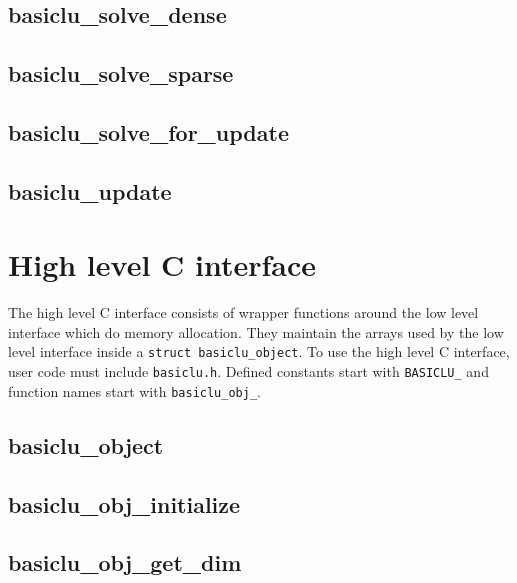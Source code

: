 \documentclass{article}
\newcommand{\ct}{\texttt}
\begin{document}
\newpage
\subsection{basiclu\_solve\_dense}
{\footnotesize

}

\newpage
\subsection{basiclu\_solve\_sparse}
{\footnotesize

}

\newpage
\subsection{basiclu\_solve\_for\_update}
{\footnotesize

}

\newpage
\subsection{basiclu\_update}
{\footnotesize

}
\newpage

\section{High level C interface}
The high level C interface consists of wrapper functions around the low level
interface which do memory allocation. They maintain the arrays used by the low
level interface inside a \ct{struct basiclu\_object}. To use the high level C
interface, user code must include \ct{basiclu.h}. Defined constants start with
\ct{BASICLU\_} and function names start with \ct{basiclu\_obj\_}.

\newpage
\subsection{basiclu\_object}
{\footnotesize

}

\newpage
\subsection{basiclu\_obj\_initialize}
{\footnotesize

}

\newpage
\subsection{basiclu\_obj\_get\_dim}
{\footnotesize

}
\end{document}
